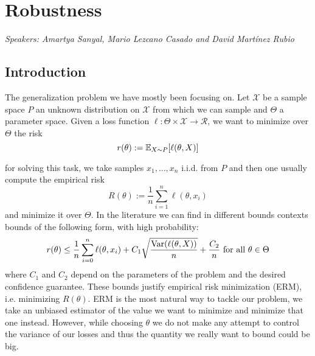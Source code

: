 
\chapter{Robustness}
\emph{Speakers: Amartya Sanyal, Mario Lezcano Casado and David Martínez Rubio }\\

%
%


\section{Introduction}
The generalization problem we have mostly been focusing on. Let $\mathcal{X}$ be a sample space $P$ an unknown distribution on $\mathcal{X}$ from which we can sample and $\Theta$ a parameter space. Given a loss function $\ell : \Theta \times \mathcal{X} \rightarrow \mathcal{R}$, we want to minimize over $\Theta$ the risk
\[
    r(\theta) := \mathbb{E}_{X\sim P} [\ell(\theta, X)]\\
\]

for solving this task, we take samples $x_1, \dots, x_n$ i.i.d. from $P$ and then one usually compute the empirical risk
\[
    R(\theta) := \frac{1}{n} \sum_{i=1}^n \ell(\theta, x_i)
\]
and minimize it over $\Theta$. In the literature we can find in different bounds contexts bounds of the following form, with high probability:
\[
    r(\theta) \leq \frac{1}{n} \sum_{i=0}^n \ell(\theta, x_i) + C_1 \sqrt{\frac{\text{Var}(\ell(\theta, X))}{n}} + \frac{C_2}{n} \text{ for all } \theta \in \Theta
\]
where $C_1$ and $C_2$ depend on the parameters of the problem and the desired confidence guarantee. These bounds justify empirical risk minimization (ERM), i.e. minimizing $R(\theta)$. ERM is the most natural way to tackle our problem, we take an unbiased estimator of the value we want to minimize and minimize that one instead. However, while choosing $\theta$ we do not make any attempt to control the variance of our losses and thus the quantity we really want to bound could be big. 

